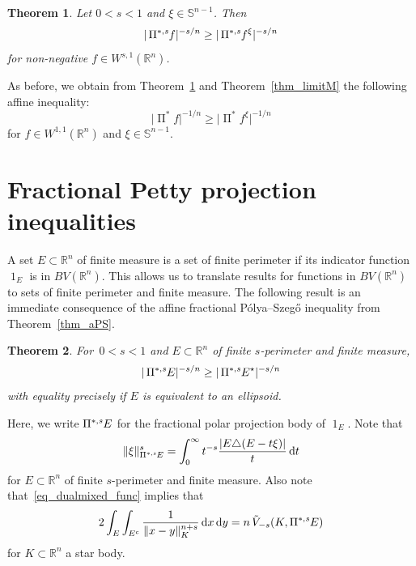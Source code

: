\documentclass{amsart}
\newtheorem{theorem}{Theorem}
\newcommand{\opp}{\operatorname{\Pi}^*\!}
\newcommand{\ofpp}[1]{\operatorname{\Pi^{\ast,{\it #1}}}\!}
\newcommand{\snvtex}{{\mathbb S}^{n-1}}
\newcommand{\dvtex}{\,\mathrm{d}}
\newcommand{\vol}[1]{ \vert #1\vert}
\renewcommand{\chi}{\operatorname{1}}
\begin{document}
\begin{theorem}%
\label{thm_aSteiner}
Let $0<s<1$ and $\xi \in \snvtex $. Then
%
\begin{equation}
\vol{\ofpp{s} f}^{-s/n} \geq \vol{\ofpp{s} f^{\xi}}^{-s/n}
\nonumber \end{equation}
%
for non-negative $f\in W^{s,1}(\mathbb R^{n})$.
\end{theorem}

As before, we obtain from Theorem~\ref{thm_aSteiner} and Theorem~\ref{thm_limitM} the following affine inequality:
%
\begin{equation}
\vol{\opp f}^{-1/n} \geq \vol{\opp f^{\xi}}^{-1/n}
\nonumber \end{equation}
%
for $f\in W^{1,1}(\mathbb R^{n})$ and $\xi \in \snvtex $.

\section{Fractional Petty projection inequalities}
\label{sec_fracpetty}

A set $E\subset \mathbb R^{n}$ of finite measure is a set of finite perimeter
if its indicator function $\chi _{E}$ is in $BV(\mathbb R^{n})$. This allows
us to translate results for functions in $BV(\mathbb R^{n})$ to sets of
finite perimeter and finite measure. The following result is an immediate
consequence of the affine fractional P\'olya--Szeg\H o inequality from
Theorem~\ref{thm_aPS}.

\begin{theorem}%
\label{thm_fracpetty1}
For $\,0<s<1$ and $E\subset \mathbb R^{n}$ of finite $s$-perimeter and
finite measure,
%
\begin{equation*}
\vol{\ofpp{s} E}^{-s/n} \geq \vol{\ofpp{s} E^{\star}}^{-s/n}
\end{equation*}
%
with equality precisely if $E$ is equivalent to an ellipsoid.
\end{theorem}

\noindent
Here, we write $\ofpp{s} E$ for the fractional polar projection body of
$\chi _{E}$. Note that
%
\begin{equation*}
\Vert \xi \Vert ^{s}_{\ofpp s E}= \int _{0}^{\infty }t^{-s}
\frac{\vol{E\triangle (E-t\xi )}}{t}\dvtex t
\end{equation*}
%
for $E\subset \mathbb R^{n}$ of finite $s$-perimeter and finite measure.
Also note that~\eqref{eq_dualmixed_func} implies that
%
\begin{equation}
\label{eq_fracperi_proj}
2 \int _{E}\int _{E^{c}} \frac{1}{\|x-y\|_{K}^{n+s}} \dvtex x \dvtex y = n\,
\tilde V_{-s}(K, \ofpp{s} E)
\end{equation}
%
for $K\subset \mathbb R^{n}$ a star body.
\end{document}
